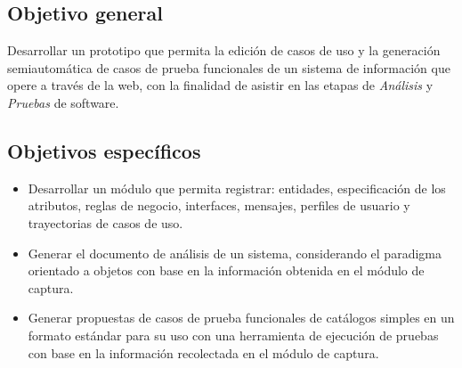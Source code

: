 \subsection{Objetivo general}

	Desarrollar un prototipo que permita la edición de casos de uso y la generación semiautomática de casos de prueba funcionales de un sistema de información que opere a través de la web, con la finalidad de asistir en las etapas de {\it Análisis} y {\it Pruebas} de software. 

\subsection{Objetivos específicos}

	\begin{itemize}
		\item Desarrollar un módulo que permita registrar: entidades, especificación de los atributos,  reglas de negocio, interfaces, mensajes, perfiles de usuario y trayectorias de casos de uso. 
		\item Generar el documento de análisis de un sistema, considerando el paradigma orientado a objetos con base en la información obtenida en el módulo de captura.
		\item Generar propuestas de casos de prueba funcionales de catálogos simples en un formato estándar para su uso con una herramienta de ejecución de pruebas con base en la información recolectada en el módulo de captura.
	\end{itemize}

